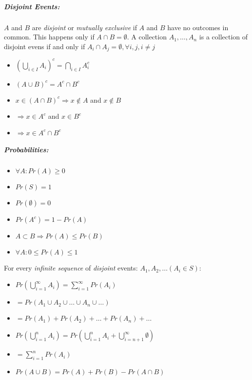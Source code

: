 \documentclass[landscape,10pt]{article}
\begin{document}
\begin{multicols}{3}
    \subparagraph*{Disjoint Events: } 
        $A$ and $B$ are \textit{disjoint} or \textit{mutually exclusive} if $A$ and $B$ have no outcomes in common. This happens only if \(A \cap B = \emptyset \). A collection \(A_1, \dots, A_n\) is a collection of disjoint evens if and only if \(A_i \cap A_j = \emptyset, \forall i, j, i \neq j\)

        \begin{itemize}[noitemsep]
            \item[] \(\left (\bigcup\limits_{i\in I} A_i \right)^c = \bigcap\limits_{i\in I}A_i^c \)
            \item[] \((A\cup B)^c = A^c \cap B^c \)
            \item[] \(x\in(A\cap B)^c 
            \Rightarrow x \notin A\) and \(x\notin B \)
            \item[] \(\Rightarrow x \in A^c \) and \(x \in B^c \)
            \item[] \(\Rightarrow x \in A^c \cap B^c \)
        \end{itemize}

    \subparagraph*{Probabilities: } 

        \begin{itemize}[noitemsep]
            \item[] $\forall A: Pr(A) \geq 0$
            \item[] $Pr(S) = 1$
            \item[] $Pr(\emptyset) = 0$
            \item[] $Pr(A^c) = 1-Pr(A)$
            \item[] $A \subset B \Rightarrow Pr(A) \leq Pr(B)$
            \item[] $\forall A: 0 \leq Pr(A) \leq 1$
        \end{itemize}
        For every \textit{infinite sequence} of \textit{disjoint} events: \( A_1, A_2, \dots (A_i \in S):\)
        \begin{itemize}
            \item[] $Pr\left(\bigcup\limits_{i=1}^{\infty}A_i\right) = \sum\limits_{i=1}^{\infty} Pr(A_i)$
            \item[] $=  Pr(A_1 \cup A_2 \cup \dots \cup A_n \cup \dots)$
            \item[] $= Pr(A_1) + Pr(A_2) + \dots + Pr(A_n) + \dots$
            \item[] $Pr(\bigcup\limits_{i=1}^{n}A_i) = Pr(\bigcup\limits_{i=1}^{n}A_i + \bigcup\limits_{i=n+1}^{\infty}\emptyset) $
            \item[] $= \sum\limits_{i=1}^{n}Pr(A_i)$
            \item[] $Pr(A\cup B) = Pr(A) + Pr(B) - Pr(A\cap B)$
        \end{itemize}


\end{multicols}
\end{document}
